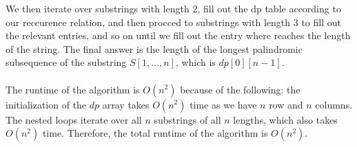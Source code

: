 \documentclass[10pt]{article}
\begin{document}
\begin{solution}
\begin{enumerate} [(a)]
            We then iterate over substrings with length $2$, fill out the dp table according to our reccurence relation, and then procced to substrings with length $3$ to fill out the relevant entries, and so on until we fill out the entry where reaches the length of the string. The final answer is the length of the longest palindromic subsequence of the substring $S[1, \ldots, n]$, which is $dp[0][n-1]$. \\\\
            The runtime of the algorithm is $O(n^2)$ because of the following: the initialization of the $dp$ array takes $O(n^2)$ time as we have $n$ row and $n$ columns. The nested loops iterate over all $n$ substrings of all $n$ lengths, which also takes $O(n^2)$ time. Therefore, the total runtime of the algorithm is $O(n^2)$.
    \end{enumerate}
\end{solution}

\newpage
\end{document}
